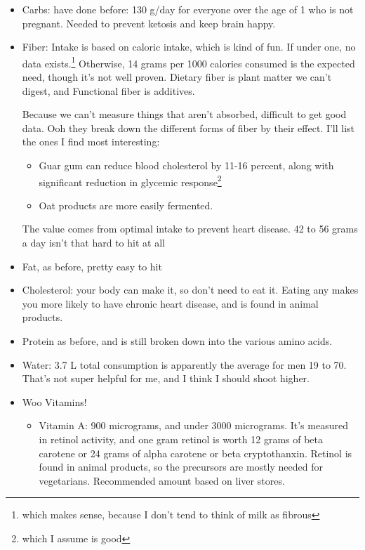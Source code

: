 \documentclass[12pt]{article}[titlepage]
\renewcommand{\,}{\textsuperscript{,}}
\begin{document}
\begin{itemize}
Walking at the pace they mention above is worth between .13 and .22 PAL per hour\footnote{this is a dangerous concept for me to be aware of, if only because I can start actually counting my movement in a variety of ways}  
\item Carbs: have done before: 130 g/day for everyone over the age of 1 who is not pregnant. Needed to prevent ketosis and keep brain happy.  
\item Fiber: Intake is based on caloric intake, which is kind of fun. If under one, no data exists.\footnote{which makes sense, because I don't tend to think of milk as fibrous} Otherwise, 14 grams per 1000 calories consumed is the expected need, though it's not well proven.  
Dietary fiber is plant matter we can't digest, and Functional fiber is additives.

Because we can't measure things that aren't absorbed, difficult to get good data. Ooh they break down the different forms of fiber by their effect. I'll list the ones I find most interesting:  
\begin{itemize}  
\item Guar gum can reduce blood cholesterol by 11-16 percent, along with significant reduction in glycemic response\footnote{which I assume is good}  
\item Oat products are more easily fermented.  
\end{itemize}  
The value comes from optimal intake to prevent heart disease. 42 to 56 grams a day isn't that hard to hit at all  
\item Fat, as before, pretty easy to hit  
\item Cholesterol: your body can make it, so don't need to eat it. Eating any makes you more likely to have chronic heart disease, and is found in animal products.  
\item Protein as before, and is still broken down into the various amino acids.  
\item Water: 3.7 L total consumption is apparently the average for men 19 to 70. That's not super helpful for me, and I think I should shoot higher.  
\item Woo Vitamins!  
\begin{itemize}  
\item Vitamin A: 900 micrograms, and under 3000 micrograms. It's measured in retinol activity, and one gram retinol is worth 12 grams of beta carotene or 24 grams of alpha carotene or beta cryptothanxin. Retinol is found in animal products, so the precursors are mostly needed for vegetarians. Recommended amount based on liver stores.  

\end{itemize}
\end{itemize}
\end{document}
